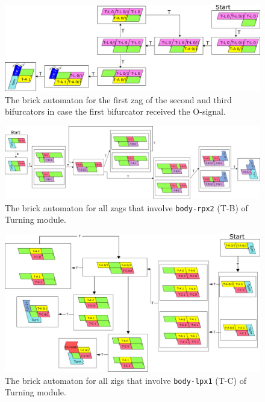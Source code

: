 \documentclass[runningheads]{llncs}
\begin{document}
\begin{figure}[ht]
\centering
\includegraphics[width=\linewidth]{Figs/Turner_BA/T-A_afterO.png}
\caption{The brick automaton for the first zag of the second and third bifurcators in case the first bifurcator received the O-signal.}
\label{fig:BA_T-A_afterO}
\end{figure}


\begin{figure}[ht]
\centering
\includegraphics[width=\linewidth]{Figs/Turner_BA/T-B.png}
\caption{The brick automaton for all zags that involve \texttt{body-rpx2} (T-B) of Turning module.}
\label{fig:BA_T-B}
\end{figure}

\begin{figure}[ht]
\centering
\includegraphics[width=\linewidth]{Figs/Turner_BA/T-C_ver2.png}
\caption{The brick automaton for all zigs that involve \texttt{body-lpx1} (T-C) of Turning module.}
\label{fig:BA_T-C}
\end{figure}
\end{document}
